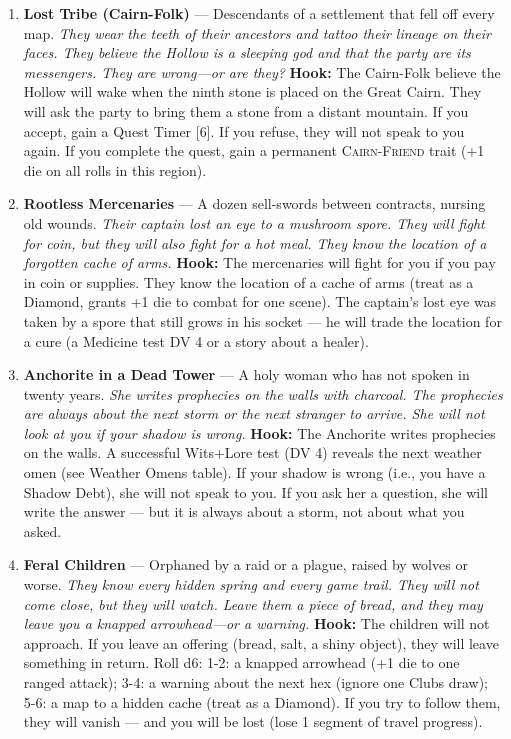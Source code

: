 \begin{enumerate}
\item \textbf{Lost Tribe (Cairn-Folk)} --- Descendants of a settlement that fell off every map.
  \hfill \textit{They wear the teeth of their ancestors and tattoo their lineage on their faces. They believe the Hollow is a sleeping god and that the party are its messengers. They are wrong---or are they?}
  \textbf{Hook:} The Cairn-Folk believe the Hollow will wake when the ninth stone is placed on the Great Cairn. They will ask the party to bring them a stone from a distant mountain. If you accept, gain a Quest Timer [6]. If you refuse, they will not speak to you again. If you complete the quest, gain a permanent \textsc{Cairn-Friend} trait (+1 die on all rolls in this region).
  
\item \textbf{Rootless Mercenaries} --- A dozen sell-swords between contracts, nursing old wounds.
  \hfill \textit{Their captain lost an eye to a mushroom spore. They will fight for coin, but they will also fight for a hot meal. They know the location of a forgotten cache of arms.}
  \textbf{Hook:} The mercenaries will fight for you if you pay in coin or supplies. They know the location of a cache of arms (treat as a Diamond, grants +1 die to combat for one scene). The captain's lost eye was taken by a spore that still grows in his socket --- he will trade the location for a cure (a Medicine test DV 4 or a story about a healer).
  
\item \textbf{Anchorite in a Dead Tower} --- A holy woman who has not spoken in twenty years.
  \hfill \textit{She writes prophecies on the walls with charcoal. The prophecies are always about the next storm or the next stranger to arrive. She will not look at you if your shadow is wrong.}
  \textbf{Hook:} The Anchorite writes prophecies on the walls. A successful Wits+Lore test (DV 4) reveals the next weather omen (see Weather Omens table). If your shadow is wrong (i.e., you have a Shadow Debt), she will not speak to you. If you ask her a question, she will write the answer --- but it is always about a storm, not about what you asked.
  
\item \textbf{Feral Children} --- Orphaned by a raid or a plague, raised by wolves or worse.
  \hfill \textit{They know every hidden spring and every game trail. They will not come close, but they will watch. Leave them a piece of bread, and they may leave you a knapped arrowhead---or a warning.}
  \textbf{Hook:} The children will not approach. If you leave an offering (bread, salt, a shiny object), they will leave something in return. Roll d6: 1-2: a knapped arrowhead (+1 die to one ranged attack); 3-4: a warning about the next hex (ignore one Clubs draw); 5-6: a map to a hidden cache (treat as a Diamond). If you try to follow them, they will vanish --- and you will be lost (lose 1 segment of travel progress).
  

\end{enumerate}
